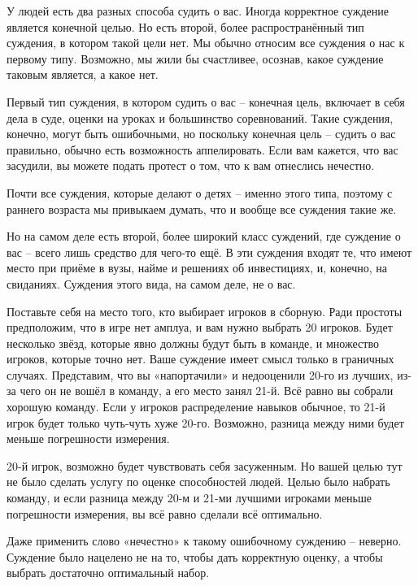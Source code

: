 \documentclass[ebook,12pt,oneside,openany]{memoir}
\begin{document}
\maketitle

У людей есть два разных способа судить о вас. Иногда корректное
суждение является конечной целью. Но есть второй, более
распространённый тип суждения, в котором такой цели нет. Мы обычно
относим все суждения о нас к первому типу. Возможно, мы жили бы
счастливее, осознав, какое суждение таковым является, а какое нет.

Первый тип суждения, в котором судить о вас – конечная цель, включает
в себя дела в суде, оценки на уроках и большинство соревнований. Такие
суждения, конечно, могут быть ошибочными, но поскольку конечная цель –
судить о вас правильно, обычно есть возможность аппелировать. Если вам
кажется, что вас засудили, вы можете подать протест о том, что к вам
отнеслись нечестно.

Почти все суждения, которые делают о детях – именно этого типа,
поэтому с раннего возраста мы привыкаем думать, что и вообще все
суждения такие же.

Но на самом деле есть второй, более широкий класс суждений, где
суждение о вас – всего лишь средство для чего-то ещё. В эти суждения
входят те, что имеют место при приёме в вузы, найме и решениях об
инвестициях, и, конечно, на свиданиях. Суждения этого вида, на самом
деле, не о вас.

Поставьте себя на место того, кто выбирает игроков в сборную. Ради
простоты предположим, что в игре нет амплуа, и вам нужно выбрать 20
игроков. Будет несколько звёзд, которые явно должны будут быть в
команде, и множество игроков, которые точно нет. Ваше суждение имеет
смысл только в граничных случаях. Представим, что вы «напортачили» и
недооценили 20-го из лучших, из-за чего он не вошёл в команду, а его
место занял 21-й. Всё равно вы собрали хорошую команду. Если у игроков
распределение навыков обычное, то 21-й игрок будет только чуть-чуть
хуже 20-го. Возможно, разница между ними будет меньше погрешности
измерения.

20-й игрок, возможно будет чувствовать себя засуженным. Но вашей целью
тут не было сделать услугу по оценке способностей людей. Целью было
набрать команду, и если разница между 20-м и 21-ми лучшими игроками
меньше погрешности измерения, вы всё равно сделали всё оптимально.

Даже применить слово «нечестно» к такому ошибочному суждению –
неверно. Суждение было нацелено не на то, чтобы дать корректную
оценку, а чтобы выбрать достаточно оптимальный набор.
\end{document}
